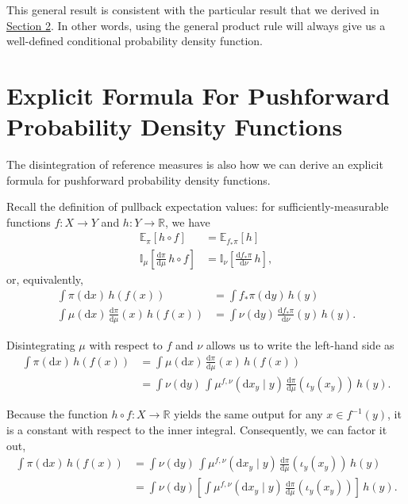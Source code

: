 \documentclass[
  letterpaper,
  DIV=11,
  numbers=noendperiod]{scrartcl}
\begin{document}
This general result is consistent with the particular result that we
derived in \hyperref[sec:discrete-conditional-density]{Section 2}. In
other words, using the general product rule will always give us a
well-defined conditional probability density function.

\section{Explicit Formula For Pushforward Probability Density
Functions}\label{sec:push-densities}

The disintegration of reference measures is also how we can derive an
explicit formula for pushforward probability density functions.

Recall the definition of pullback expectation values: for
sufficiently-measurable functions \(f : X \rightarrow Y\) and
\(h : Y \rightarrow \mathbb{R}\), we have \begin{align*}
\mathbb{E}_{\pi} \! \left[  h \circ f  \right]
&=
\mathbb{E}_{f_{*} \pi} \! \left[  h  \right]
\\
\mathbb{I}_{\mu} \! \left[  \frac{ \mathrm{d}  \pi }{ \mathrm{d}  \mu  } \, h \circ f  \right]
&=
\mathbb{I}_{\nu} \! \left[  \frac{ \mathrm{d}  f_{*} \pi }{ \mathrm{d}  \nu  } \, h  \right],
\end{align*} or, equivalently, \begin{align*}
\int \pi( \mathrm{d} x ) \, h(f(x))
&=
\int f_{*} \pi( \mathrm{d} y )  \, h(y)
\\
\int \mu( \mathrm{d} x ) \, \frac{ \mathrm{d}  \pi }{ \mathrm{d}  \mu  }(x) \, h(f(x))
&=
\int \nu( \mathrm{d} y ) \, \frac{ \mathrm{d}  f_{*} \pi }{ \mathrm{d}  \nu  }(y) \, h(y).
\end{align*}

Disintegrating \(\mu\) with respect to \(f\) and \(\nu\) allows us to
write the left-hand side as \begin{align*}
\int \pi( \mathrm{d} x ) \, h(f(x))
&=
\int \mu( \mathrm{d} x ) \, \frac{ \mathrm{d} \pi}{ \mathrm{d} \mu }(x) \, h(f(x))
\\
&=
\int \nu( \mathrm{d} y ) \,
\int \mu^{f, \nu}( \mathrm{d} x_{y} \mid y ) \,
\frac{ \mathrm{d} \pi}{ \mathrm{d} \mu }( \iota_{y}(x_{y}) ) \, h(y).
\end{align*}

Because the function \(h \circ f : X \rightarrow \mathbb{R}\) yields the
same output for any \(x \in f^{-1}(y)\), it is a constant with respect
to the inner integral. Consequently, we can factor it out,
\begin{align*}
\int \pi( \mathrm{d} x ) \, h(f(x))
&=
\int \nu( \mathrm{d} y ) \,
\int \mu^{f, \nu}( \mathrm{d} x_{y} \mid y ) \,
\frac{ \mathrm{d} \pi}{ \mathrm{d} \mu }( \iota_{y}(x_{y}) ) \, h(y)
\\
&=
\int \nu( \mathrm{d} y )
\left[
  \int \mu^{f, \nu}( \mathrm{d} x_{y} \mid y ) \,
       \frac{ \mathrm{d} \pi}{ \mathrm{d} \mu }( \iota_{y}(x_{y}) )
\right] \, h(y).
\end{align*}
\end{document}
